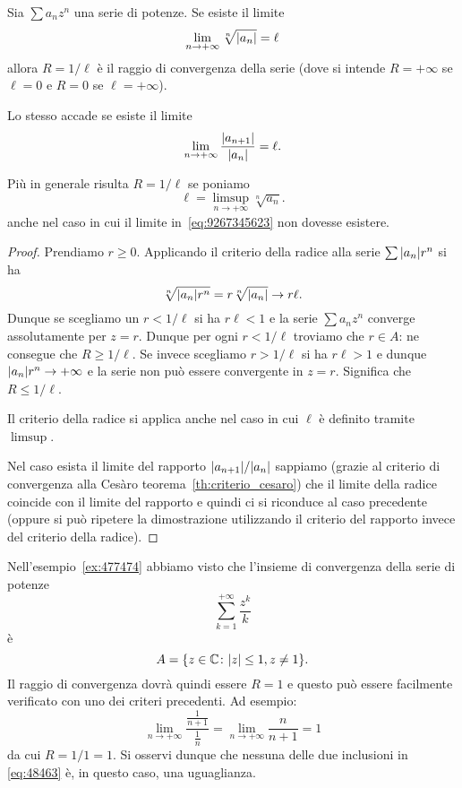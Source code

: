 \begin{theorem}
\mymark{***}
\label{th:calcolo_raggio_convergenza}
Sia $\sum a_n z^n$ una serie di potenze. Se esiste il limite
\begin{equation}\label{eq:9267345623}
  \lim_{n\to+\infty}\sqrt[n]{{\left|a_n\right|}} =\ell
\end{equation}
allora $R=1/\ell$ è il raggio di convergenza della serie
(dove si intende $R=+\infty$ se $\ell = 0$ e $R=0$ se $\ell=+\infty$).

Lo stesso accade se esiste il limite
\[
  \lim_{n\to +\infty} \frac{{\left|a_{n+1}\right|}}{{\left|a_n\right|}} = \ell.
\]

Più in generale risulta $R=1/\ell$ se poniamo
\[
   \ell = \limsup_{n\to +\infty} \sqrt[n]{a_n}.
\]
anche nel caso in cui il limite in~\eqref{eq:9267345623}
non dovesse esistere.
\end{theorem}
%
\begin{proof}
\mymark{***}
Prendiamo $r\ge 0$.
Applicando il criterio della radice alla serie $\sum {\left|a_n\right|} r^n$ si ha
\[
  \sqrt[n]{{\left|a_n\right|} r^n}
  = r \sqrt[n]{{\left|a_n\right|}} \to r\ell.
\]
Dunque se scegliamo un $r < 1/\ell$ si ha $r \ell<1$ e la serie
$\sum a_n z^n$ converge
assolutamente per $z=r$.
Dunque per ogni $r<1/\ell$
troviamo che $r\in A$: ne consegue che $R\ge 1/\ell$.
Se invece scegliamo $r > 1/\ell$ si ha $r \ell > 1$ e dunque
${\left|a_n\right|} r^n \to +\infty$ e la serie non può essere convergente
in $z=r$. Significa che $R\le 1/\ell$.

Il criterio della radice si applica anche nel caso in cui $\ell$ è definito
tramite $\limsup$.

Nel caso esista il limite del rapporto ${\left|a_{n+1}\right|} / {\left|a_n\right|}$
sappiamo (grazie al criterio di convergenza alla Cesàro teorema~\ref{th:criterio_cesaro}) che
il limite della radice coincide con il limite del rapporto e quindi
ci si riconduce al caso precedente (oppure si può ripetere la dimostrazione
utilizzando il criterio del rapporto invece del criterio della radice).
\end{proof}

\begin{example}
Nell'esempio~\ref{ex:477474} abbiamo visto
che l'insieme di convergenza della serie di potenze
\[
  \sum_{k=1}^{+\infty} \frac{z^k}{k}
\]
è
\[
  A = {\left\{  z\in \mathbb C \colon {\left|z\right|}\le 1, z\neq 1 \right\}}.
\]
Il raggio di convergenza dovrà quindi essere $R=1$ e questo può essere
facilmente verificato con uno dei criteri precedenti. Ad esempio:
\[
  \lim_{n\to+\infty} \frac{\frac{1}{n+1}}{\frac{1}{n}}
  = \lim_{n\to+\infty} \frac{n}{n+1} = 1
\]
da cui $R=1/1=1$.
Si osservi dunque che nessuna delle due inclusioni in \eqref{eq:48463}
è, in questo caso, una uguaglianza.
\end{example}


